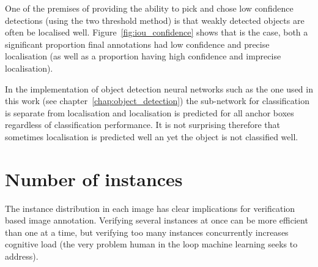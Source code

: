 One of the premises of providing the ability to pick and chose low confidence detections (using the two threshold method) is that weakly detected objects are often be localised well. Figure~\ref{fig:iou_confidence} shows that is the case, both a significant proportion final annotations had low confidence and  precise localisation (as well as a proportion having high confidence and imprecise localisation).


\begin{table}[h]
\caption{Breakdown by dataset of detections included as an annotation; confident if $ p > 0.7 $, precise if $ IoU > 0.85 $ with respect to final annotation} 
\noindent{}
\label{tab:confidence_precision}
\end{table}

In the implementation of object detection neural networks such as the one used in this work (see chapter~\ref{chap:object_detection}) the sub-network for classification is separate from localisation and localisation is predicted for all anchor boxes regardless of classification performance. It is not surprising therefore that sometimes localisation is predicted well an yet the object is not classified well.


\section{Number of instances}
\label{sec:instances_discussion}

The instance distribution in each image has clear implications for verification based image annotation. Verifying several instances at once can be more efficient than one at a time, but verifying too many instances concurrently increases cognitive load (the very problem human in the loop machine learning seeks to address). 

